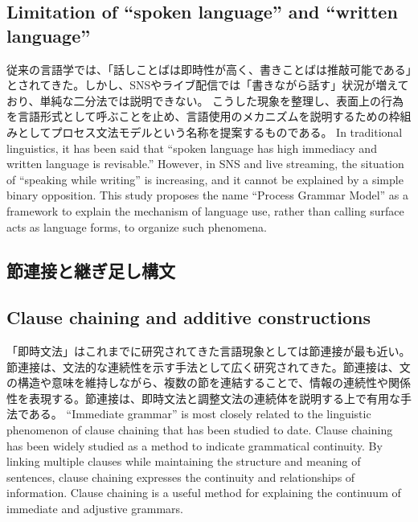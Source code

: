 \documentclass[a4paper,xelatex,ja=standard]{bxjsarticle}
\begin{document}
  \subsection{Limitation of ``spoken language'' and ``written language''}
\fi

\ifJPN
従来の言語学では、「話しことばは即時性が高く、書きことばは推敲可能である」とされてきた。しかし、SNSやライブ配信では「書きながら話す」状況が増えており、単純な二分法では説明できない。
こうした現象を整理し、表面上の行為を言語形式として呼ぶことを止め、言語使用のメカニズムを説明するための枠組みとしてプロセス文法モデルという名称を提案するものである。
\else
In traditional linguistics, it has been said that ``spoken language has high immediacy and written language is revisable.'' However, in SNS and live streaming, the situation of ``speaking while writing'' is increasing, and it cannot be explained by a simple binary opposition.
This study proposes the name ``Process Grammar Model'' as a framework to explain the mechanism of language use, rather than calling surface acts as language forms, to organize such phenomena.
\fi


\ifJPN
  \subsection{節連接と継ぎ足し構文}
\else
  \subsection{Clause chaining and additive constructions}
\fi

\ifJPN
「即時文法」はこれまでに研究されてきた言語現象としては節連接が最も近い。
節連接は、文法的な連続性を示す手法として広く研究されてきた。節連接は、文の構造や意味を維持しながら、複数の節を連結することで、情報の連続性や関係性を表現する。節連接は、即時文法と調整文法の連続体を説明する上で有用な手法である。
\else
``Immediate grammar'' is most closely related to the linguistic phenomenon of clause chaining that has been studied to date. Clause chaining has been widely studied as a method to indicate grammatical continuity. By linking multiple clauses while maintaining the structure and meaning of sentences, clause chaining expresses the continuity and relationships of information. Clause chaining is a useful method for explaining the continuum of immediate and adjustive grammars.
\fi
\end{document}
